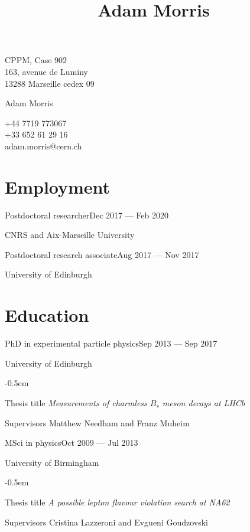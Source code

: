 \documentclass[contbibnum,titleabove]{simplecv}
\title{Adam Morris}
\newcommand\dateditem[2]{\vspace{0.5em}#1\hfill#2\par}
\newcommand\topictitle[3]{\par\dateditem{#1}{#3}{\color{darkgray}#2}}
\begin{document}
	\fontfamily{\typeface}\selectfont
	\noindent\begin{minipage}{0.33\textwidth}
	CPPM, Case 902\\163, avenue de Luminy\\13288 Marseille cedex 09
	\end{minipage}
	\noindent\begin{minipage}{0.33\textwidth}
	\centering
	\huge Adam Morris
	\end{minipage}
	\noindent\begin{minipage}{0.33\textwidth}
	\raggedleft
	+44 7719 773067\\+33 652 61 29 16\\{adam.morris@cern.ch}
	\end{minipage}
	\section{Employment}
	\topictitle{Postdoctoral researcher}{CNRS and Aix-Marseille University}{Dec 2017 --- Feb 2020}
	\topictitle{Postdoctoral research associate}{University of Edinburgh}{Aug 2017 --- Nov 2017}
	\section{Education}
	\topictitle{PhD in experimental particle physics}{University of Edinburgh}{Sep 2013 --- Sep 2017}
	\begin{topic}
	\itemsep-0.5em
		\item[Thesis title]{\textit{Measurements of charmless $B_s$ meson decays at LHCb}}
		\item[Supervisors]{Matthew Needham and Franz Muheim}
	\end{topic}
	\topictitle{MSci in physics}{University of Birmingham}{Oct 2009 --- Jul 2013}
	\begin{topic}
		\itemsep-0.5em
		\item[Thesis title]{\textit{A possible lepton flavour violation search at NA62}}
		\item[Supervisors]{Cristina Lazzeroni and Evgueni Goudzovski}
	\end{topic}
\end{document}
